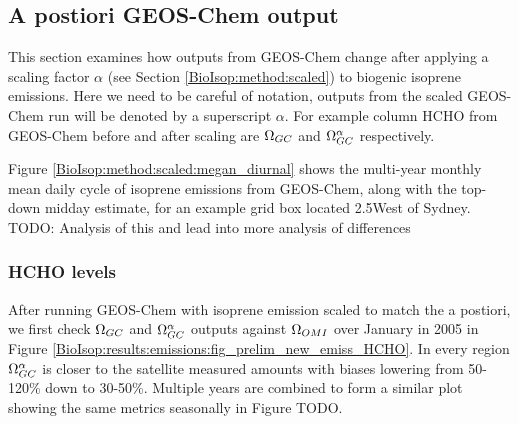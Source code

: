     
  \subsection{A postiori GEOS-Chem output}
  \label{BioIsop:results:new_emiss}
    
    This section examines how outputs from GEOS-Chem change after applying a scaling factor $\alpha$ (see Section \ref{BioIsop:method:scaled}) to biogenic isoprene emissions.
    Here we need to be careful of notation, outputs from the scaled GEOS-Chem run will be denoted by a superscript $\alpha$.
    For example column HCHO from GEOS-Chem before and after scaling are $\Omega_{GC}$ and $\Omega_{GC}^{\alpha}$ respectively.
    
    Figure \ref{BioIsop:method:scaled:megan_diurnal} shows the multi-year monthly mean daily cycle of isoprene emissions from GEOS-Chem, along with the top-down midday estimate, for an example grid box located 2.5\degr West of Sydney.
    TODO: Analysis of this and lead into more analysis of differences
    
    
    \subsubsection{HCHO levels}
  
      After running GEOS-Chem with isoprene emission scaled to match the a postiori, we first check $\Omega_{GC}$ and $\Omega_{GC}^{\alpha}$ outputs against $\Omega_{OMI}$ over January in 2005 in Figure \ref{BioIsop:results:emissions:fig_prelim_new_emiss_HCHO}.
      In every region $\Omega_{GC}^{\alpha}$ is closer to the satellite measured amounts with biases lowering from 50-120\% down to 30-50\%.
      Multiple years are combined to form a similar plot showing the same metrics seasonally in Figure TODO.
      
